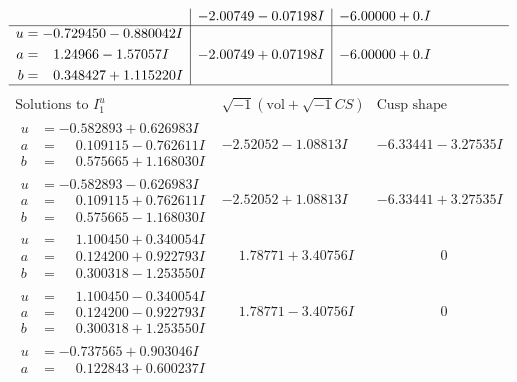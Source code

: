 \documentclass[1p]{elsarticle_modified}
\theoremstyle{definition}
\newcommand{\I}{\sqrt{-1}}
\begin{document}
$$\begin{array}{c|c|c}
 & -2.00749 - 0.07198 I & -6.00000 + 0. I\phantom{ +0.000000I} \\ \hline\begin{aligned}
u &= -0.729450 - 0.880042 I \\
a &= \phantom{-}1.24966 - 1.57057 I \\
b &= \phantom{-}0.348427 + 1.115220 I\end{aligned}
 & -2.00749 + 0.07198 I & -6.00000 + 0. I\phantom{ +0.000000I}\\
 \hline 
 \end{array}$$\newpage$$\begin{array}{c|c|c}  
\text{Solutions to }I^u_{1}& \I (\text{vol} + \sqrt{-1}CS) & \text{Cusp shape}\\
 \hline 
\begin{aligned}
u &= -0.582893 + 0.626983 I \\
a &= \phantom{-}0.109115 - 0.762611 I \\
b &= \phantom{-}0.575665 + 1.168030 I\end{aligned}
 & -2.52052 - 1.08813 I & -6.33441 - 3.27535 I \\ \hline\begin{aligned}
u &= -0.582893 - 0.626983 I \\
a &= \phantom{-}0.109115 + 0.762611 I \\
b &= \phantom{-}0.575665 - 1.168030 I\end{aligned}
 & -2.52052 + 1.08813 I & -6.33441 + 3.27535 I \\ \hline\begin{aligned}
u &= \phantom{-}1.100450 + 0.340054 I \\
a &= \phantom{-}0.124200 + 0.922793 I \\
b &= \phantom{-}0.300318 - 1.253550 I\end{aligned}
 & \phantom{-}1.78771 + 3.40756 I & \phantom{-0.000000 } 0 \\ \hline\begin{aligned}
u &= \phantom{-}1.100450 - 0.340054 I \\
a &= \phantom{-}0.124200 - 0.922793 I \\
b &= \phantom{-}0.300318 + 1.253550 I\end{aligned}
 & \phantom{-}1.78771 - 3.40756 I & \phantom{-0.000000 } 0 \\ \hline\begin{aligned}
u &= -0.737565 + 0.903046 I \\
a &= \phantom{-}0.122843 + 0.600237 I \\

\end{aligned}
\end{array}$$
\end{document}
